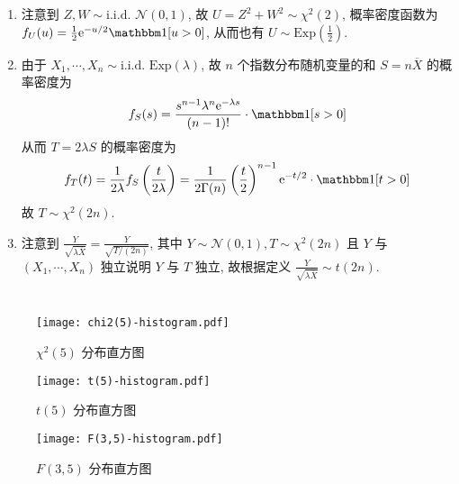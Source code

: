 \documentclass[8pt]{article}
\theoremstyle{compact}
\def\e{\mathrm{e}}
\begin{document}
\section{}
\begin{enumerate}
	\item 注意到 $Z, W \sim \text{i.i.d. } \mathcal N(0, 1)$, 故 $U = Z^2 + W^2 \sim \chi^2(2)$, 概率密度函数为 $f_U(u) = \frac12\e^{-u/2} \mathbbm 1[u > 0]$, 从而也有 $U \sim \text{Exp}\left(\frac12\right)$.
	\item 由于 $X_1, \cdots, X_n \sim \text{i.i.d. } \text{Exp}(\lambda)$, 故 $n$ 个指数分布随机变量的和 $S = n\overline{X}$ 的概率密度为 $$f_S(s) = \frac{s^{n-1}\lambda^n\e^{-\lambda s}}{(n-1)!}\cdot \mathbbm 1[s > 0]$$ 从而 $T = 2\lambda S$ 的概率密度为 $$f_T(t) = \frac{1}{2\lambda} f_S\left(\frac{t}{2\lambda}\right) = \frac{1}{2\Gamma(n)}\left(\frac t2\right)^{n-1}\e^{-t/2} \cdot \mathbbm 1[t > 0]$$ 故 $T \sim \chi^2(2n)$.
	\item 注意到 $\frac{Y}{\sqrt{\lambda \overline{X}}} = \frac{Y}{\sqrt{T / (2n)}}$, 其中 $Y \sim \mathcal N(0, 1), T \sim \chi^2(2n)$ 且 $Y$ 与 $(X_1, \cdots, X_n)$ 独立说明 $Y$ 与 $T$ 独立, 故根据定义 $\frac{Y}{\sqrt{\lambda \overline{X}}} \sim t(2n)$.
\end{enumerate}

\section{}
\begin{figure}[h]
	\centering
	\texttt{[image: chi2(5)-histogram.pdf]}
	\caption{$\chi^2(5)$ 分布直方图}
\end{figure}
\begin{figure}[h]
	\centering
	\texttt{[image: t(5)-histogram.pdf]}
	\caption{$t(5)$ 分布直方图}
\end{figure}
\begin{figure}[h]
	\centering
	\texttt{[image: F(3,5)-histogram.pdf]}
	\caption{$F(3, 5)$ 分布直方图}
\end{figure}
\end{document}
